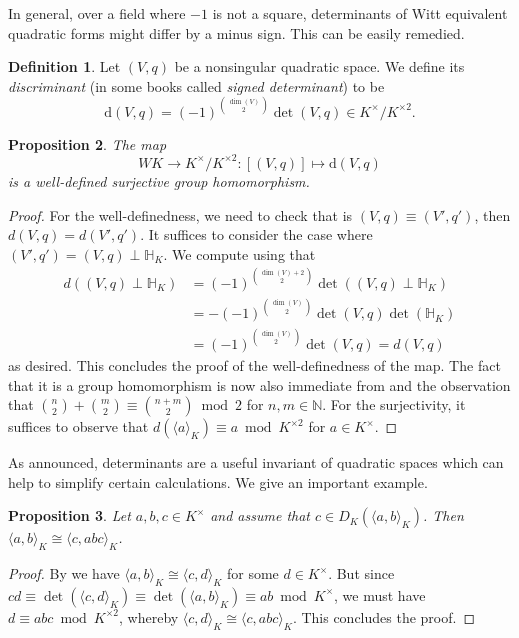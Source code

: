 \documentclass[12pt, leqno, british]{amsart}
\theoremstyle{definition}
\newtheorem{defi}{Definition}[subsection]
\theoremstyle{plain}
\newtheorem{prop}[defi]{Proposition}
\theoremstyle{remark}
\newcommand{\mbb}{\mathbb}
\newcommand{\nat}{\mbb N}
\newcommand{\disc}{\mathrm{d}}
\begin{document}
In general, over a field where $-1$ is not a square, determinants of Witt equivalent quadratic forms might differ by a minus sign.
This can be easily remedied.
\begin{defi}
Let $(V, q)$ be a nonsingular quadratic space.
We define its \emph{discriminant} (in some books called \emph{signed determinant}) to be
$$ \disc(V, q) = (-1)^{\binom{\dim(V)}{2}} \det(V, q) \in K^\times/K^{\times 2}.$$
\end{defi}
\begin{prop}
The map
$$ WK \to K^\times/K^{\times 2} : [(V, q)] \mapsto \disc(V, q) $$
is a well-defined surjective group homomorphism.
\end{prop}
\begin{proof}
For the well-definedness, we need to check that is $(V, q) \equiv (V', q')$, then $d(V, q) = d(V', q')$.
It suffices to consider the case where $(V', q') = (V, q) \perp \mbb{H}_K$.
We compute using  that
\begin{align*}
d((V, q) \perp \mbb{H}_K) &= (-1)^{\binom{\dim(V)+2}{2}}\det((V, q) \perp \mbb{H}_K ) \\
&= - (-1)^{\binom{\dim(V)}{2}} \det(V, q) \det(\mbb{H}_K) \\
&= (-1)^{\binom{\dim(V)}{2}} \det(V, q) = d(V, q)
\end{align*}
as desired.
This concludes the proof of the well-definedness of the map.
The fact that it is a group homomorphism is now also immediate from  and the observation that $\binom{n}{2} + \binom{m}{2} \equiv \binom{n+m}{2} \bmod 2$ for $n, m \in \nat$.
For the surjectivity, it suffices to observe that $d(\langle a \rangle_K) \equiv a \bmod K^{\times 2}$ for $a \in K^\times$.
\end{proof}
As announced, determinants are a useful invariant of quadratic spaces which can help to simplify certain calculations.
We give an important example.
\begin{prop}\label{P:binary-form-determinant}
Let $a, b, c \in K^\times$ and assume that $c \in D_K(\langle a, b \rangle_K)$.
Then $\langle a, b \rangle_K \cong \langle c, abc \rangle_K$.
\end{prop}
\begin{proof}
By  we have $\langle a, b \rangle_K \cong \langle c, d \rangle_K$ for some $d \in K^\times$.
But since $cd \equiv \det(\langle c, d \rangle_K) \equiv \det(\langle a, b \rangle_K) \equiv ab \bmod K^\times$, we must have $d \equiv abc \bmod K^{\times 2}$, whereby $\langle c, d \rangle_K \cong \langle c, abc \rangle_K$.
This concludes the proof.
\end{proof}
\end{document}
